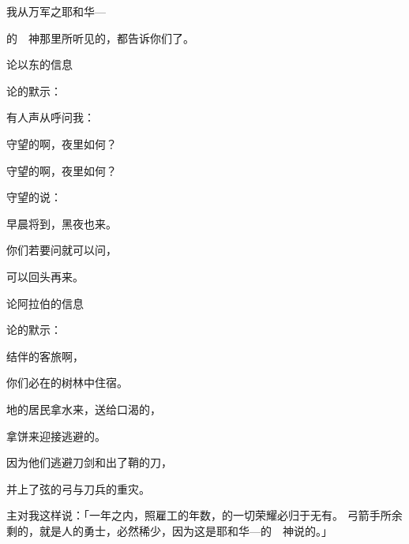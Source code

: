 {\par }{\Q 我从万军之耶和华—
\par }{的　神那里所听见的，都告诉你们了。
\par }{\SH 论以东的信息
\par }{\Q {}论{}的默示：
\par }{\Q 有人声从{}呼问我{}：
\par }{\Q 守望的啊，夜里如何？
\par }{\Q 守望的啊，夜里如何？
\par }{\Q {}守望的说：
\par }{\Q 早晨将到，黑夜也来。
\par }{\Q 你们若要问就可以问，
\par }{\Q 可以回头再来。
\par }{\SH 论阿拉伯的信息
\par }{\Q {}论{}的默示：
\par }{结伴的客旅啊，
\par }{\Q 你们必在{}的树林中住宿。
\par }{\Q {}地的居民拿水来，送给口渴的，
\par }{\Q 拿饼来迎接逃避的。
\par }{\Q {}因为他们逃避刀剑和出了鞘的刀，
\par }{\Q 并上了弦的弓与刀兵的重灾。
\par }{\PP {}主对我这样说：「一年之内，照雇工的年数，{}的一切荣耀必归于无有。
弓箭手所余剩的，就是{}人的勇士，必然稀少，因为这是耶和华—{}的　神说的。」

}
